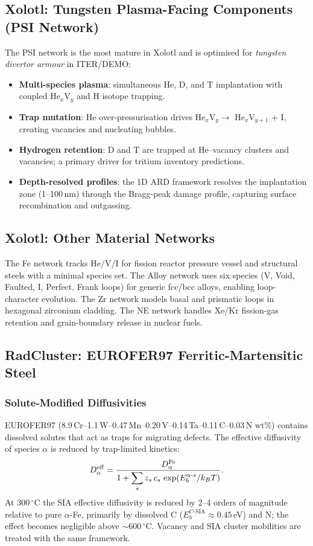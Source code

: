 \documentclass[12pt,letterpaper]{article}
\begin{document}
\subsection{Xolotl: Tungsten Plasma-Facing Components (PSI Network)}

The PSI network is the most mature in Xolotl and is optimised for
\emph{tungsten divertor armour} in ITER/DEMO:
\begin{itemize}
  \item \textbf{Multi-species plasma}: simultaneous He, D, and T
    implantation with coupled He$_x$V$_y$ and H isotope trapping.
  \item \textbf{Trap mutation}: He over-pressurisation drives
    He$_x$V$_y \to$ He$_x$V$_{y+1}$ + I, creating vacancies and
    nucleating bubbles.
  \item \textbf{Hydrogen retention}: D and T are trapped at He--vacancy
    clusters and vacancies; a primary driver for tritium inventory
    predictions.
  \item \textbf{Depth-resolved profiles}: the 1D ARD framework resolves
    the implantation zone (1--100\,nm) through the Bragg-peak damage
    profile, capturing surface recombination and outgassing.
\end{itemize}

\subsection{Xolotl: Other Material Networks}

The Fe network tracks He/V/I for fission reactor pressure vessel and
structural steels with a minimal species set.  The Alloy network uses
six species (V, Void, Faulted, I, Perfect, Frank loops) for generic
fcc/bcc alloys, enabling loop-character evolution.  The Zr network
models basal and prismatic loops in hexagonal zirconium cladding.
The NE network handles Xe/Kr fission-gas retention and grain-boundary
release in nuclear fuels.

\subsection{RadCluster: EUROFER97 Ferritic-Martensitic Steel}

\subsubsection{Solute-Modified Diffusivities}

EUROFER97 (8.9\,Cr--1.1\,W--0.47\,Mn--0.20\,V--0.14\,Ta--0.11\,C--0.03\,N
wt\%) contains dissolved solutes that act as traps for migrating defects.
The effective diffusivity of species $\alpha$ is reduced by
trap-limited kinetics:
\begin{equation}
  D_\alpha^{\rm eff}
  = \frac{D_\alpha^{\rm Fe}}{1 + \displaystyle\sum_s z_s\,c_s\,\exp(E_b^{\alpha\text{-}s}/k_BT)}.
\end{equation}
At 300\,$^\circ$C the SIA effective diffusivity is reduced by 2--4 orders of
magnitude relative to pure $\alpha$-Fe, primarily by dissolved C
($E_b^{C\text{-SIA}} \approx 0.45$\,eV) and N; the effect becomes
negligible above $\sim$600\,$^\circ$C.  Vacancy and SIA cluster
mobilities are treated with the same framework.
\end{document}

